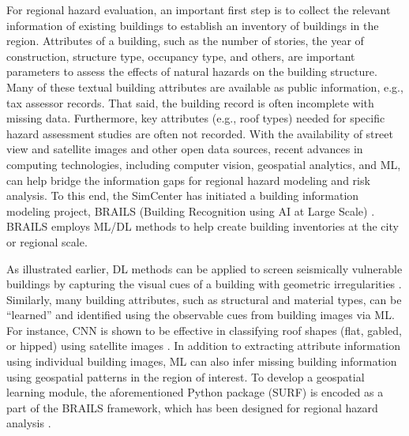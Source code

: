 For regional hazard evaluation, an important first step is to collect the relevant information of existing buildings to establish an inventory of buildings in the region. Attributes of a building, such as the number of stories, the year of construction, structure type, occupancy type, and others, are important parameters to assess the effects of natural hazards on the building structure. Many of these textual building attributes are available as public information, e.g., tax assessor records. That said, the building record is often incomplete with missing data. Furthermore, key attributes (e.g., roof types) needed for specific hazard assessment studies are often not recorded. With the availability of street view and satellite images and other open data sources, recent advances in computing technologies, including computer vision, geospatial analytics, and ML, can help bridge the information gaps for regional hazard modeling and risk analysis. To this end, the SimCenter has initiated a building information modeling project, BRAILS (Building Recognition using AI at Large Scale) \citep{yu2019building}. BRAILS employs ML/DL methods to help create building inventories at the city or regional scale.

As illustrated earlier, DL methods can be applied to screen seismically vulnerable buildings by capturing the visual cues of a building with geometric irregularities \citep{yu2020largescale}. Similarly, many building attributes, such as structural and material types, can be ``learned'' and identified using the observable cues from building images via ML. For instance, CNN is shown to be effective in classifying roof shapes (flat, gabled, or hipped) using satellite images \citep{yu2020largescale}. In addition to extracting attribute information using individual building images, ML can also infer missing building information using geospatial patterns in the region of interest. To develop a geospatial learning module, the aforementioned Python package (SURF) is encoded as a part of the BRAILS framework, which has been designed for regional hazard analysis \citep{wang2019surf}. 

